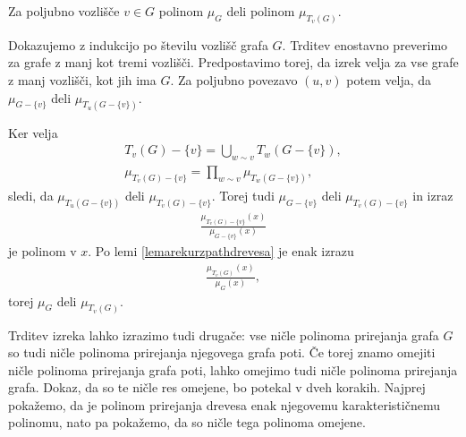 \begin{izrek}
    Za poljubno vozlišče \(v\in G\) polinom \(\mu_G\) deli polinom \(\mu_{T_v(G)}\).
\end{izrek}
\begin{dokaz}
    Dokazujemo z indukcijo po številu vozlišč grafa \(G\). Trditev enostavno preverimo za grafe z manj kot tremi vozlišči. Predpostavimo torej, da izrek velja za vse grafe z manj vozlišči, kot jih ima \(G\). Za poljubno povezavo \((u, v)\) potem velja, da \(\mu_{G-\{v\}}\) deli \(\mu_{T_u(G-\{v\})}\).

    Ker velja
    \begin{align*}
        T_v(G) - \{v\} = \bigcup_{w\sim v} T_w(G-\{v\}), \\
        \mu_{T_v(G) - \{v\}} = \prod_{w\sim v} \mu_{T_w(G-\{v\})},
    \end{align*}
    sledi, da \(\mu_{T_u(G-\{v\})}\) deli \(\mu_{T_v(G) - \{v\}}\). Torej tudi \(\mu_{G-\{v\}}\) deli \(\mu_{T_v(G) - \{v\}}\) in izraz
    \begin{align*}
        \frac{\mu_{T_v(G) - \{v\}}(x)}{\mu_{G-\{v\}}(x)}
    \end{align*}
    je polinom v \(x\). Po lemi \ref{lemarekurzpathdrevesa} je enak izrazu
    \begin{align*}
        \frac{\mu_{T_v(G)}(x)}{\mu_{G}(x)},
    \end{align*}
    torej \(\mu_G\) deli \(\mu_{T_v(G)}\).
\end{dokaz}

Trditev izreka lahko izrazimo tudi drugače: vse ničle polinoma prirejanja grafa \(G\) so tudi ničle polinoma prirejanja njegovega grafa poti. Če torej znamo omejiti ničle polinoma prirejanja grafa poti, lahko omejimo tudi ničle polinoma prirejanja grafa. Dokaz, da so te ničle res omejene, bo potekal v dveh korakih. Najprej pokažemo, da je polinom prirejanja drevesa enak njegovemu karakterističnemu polinomu, nato pa pokažemo, da so ničle tega polinoma omejene.

